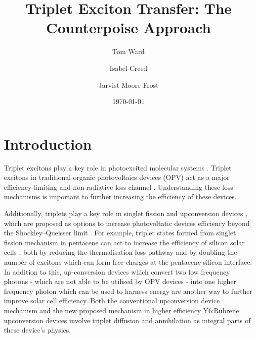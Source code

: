 \documentclass[aps,physrev,reprint,superscriptaddress,nofootinbib,amsmath,amssymb,a4paper]{revtex4-2}
\begin{document}
\title{Triplet Exciton Transfer: The Counterpoise Approach}
\date{\today} %

\author{Tom Ward}
\author{Isabel Creed}
\author{Jarvist Moore Frost}

\begin{abstract}
\end{abstract}
\maketitle



\section{Introduction}\label{introduction}

Triplet excitons play a key role in  photoexcited molecular systems \cite{Zhang2024,Quintes2023}.  
Triplet excitons in traditional organic photovoltaics devices (OPV) act as a major efficiency-limiting and non-radiative loss channel \cite{MarinBeloqui2021,Guo2022, Grne2023}. Understanding these loss mechanisms is important to further increasing the efficiency of these devices\cite{Gillett2021, Wang2021, Zhou2025, Chen2021}.  

Additionally, triplets play a key role in singlet fission \cite{Miyata2019, Hudson2022, Maity2022} and upconversion devices \cite{Feng2025,Zeng2022}, which are proposed as options to increase photovoltatic devices efficiency beyond the Shockley–Queisser  limit \cite{Carrod2022, Maiti2023}. For example, triplet states formed from singlet fission mechanism in pentacene can act to increase the efficiency of silicon solar cells \cite{Daiber2021}, both by reducing the thermalisation loss pathway and by doubling the number of excitons which can form free-charges at the pentacene-silicon interface.  In addition to this, up-conversion devices which convert two low frequency photons - which are not able to be utilised by OPV devices - into one higher frequency photon which can be used to harness energy are another way to further improve solar cell efficiency. Both the conventional upconversion device mechanism \cite{Rao2022, Fu2024, Keerthana2026} and the new proposed mechanism in  higher efficiency Y6:Rubrene upconversion devices \cite{izawa2021efficient} involve triplet diffusion and annihilation as integral parts of these device's physics. 
\end{document}
